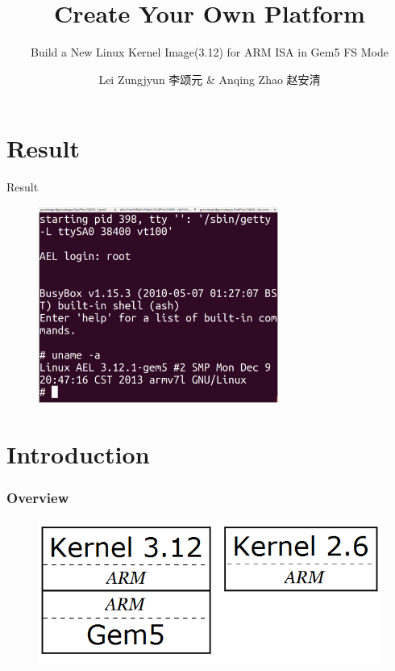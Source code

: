 \documentclass{beamer}
\title{Create Your Own Platform}
\subtitle{Build a New Linux Kernel Image(3.12) for ARM ISA in Gem5 FS Mode}
\author{Lei Zungjyun 李颂元 \& Anqing Zhao 赵安清 }
\institute{College of Computer Science and Technology,  Zhejiang University}
\date{}
\begin{document}
\begin{frame}
\titlepage
\end{frame}

\part{Result}
\begin{frame}
\partpage
\end{frame}
\begin{frame}{Result}
\begin{figure}
\includegraphics[width=0.7\textwidth]{images/result.png}
\end{figure}
\end{frame}


\part{Introduction}
\begin{frame}
\partpage
\end{frame}

\section{Overview}
\begin{frame}{\secname}
\begin{figure}
\includegraphics[width=\textwidth]{images/arch2.png}

\end{figure}

\end{frame}
\end{document}
